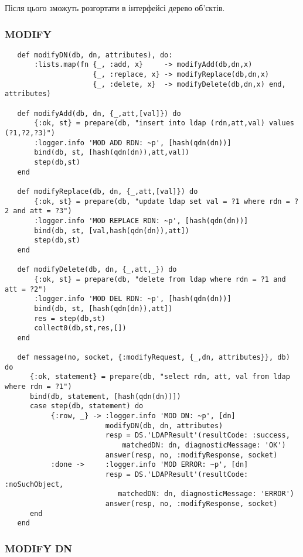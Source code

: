 Після цього зможуть розгортати в інтерфейсі дерево об'єктів.

\newpage
\subsubsection{MODIFY}

\begin{lstlisting}
   def modifyDN(db, dn, attributes), do:
       :lists.map(fn {_, :add, x}     -> modifyAdd(db,dn,x)
                     {_, :replace, x} -> modifyReplace(db,dn,x)
                     {_, :delete, x}  -> modifyDelete(db,dn,x) end, attributes)

   def modifyAdd(db, dn, {_,att,[val]}) do
       {:ok, st} = prepare(db, "insert into ldap (rdn,att,val) values (?1,?2,?3)")
       :logger.info 'MOD ADD RDN: ~p', [hash(qdn(dn))]
       bind(db, st, [hash(qdn(dn)),att,val])
       step(db,st)
   end

   def modifyReplace(db, dn, {_,att,[val]}) do
       {:ok, st} = prepare(db, "update ldap set val = ?1 where rdn = ?2 and att = ?3")
       :logger.info 'MOD REPLACE RDN: ~p', [hash(qdn(dn))]
       bind(db, st, [val,hash(qdn(dn)),att])
       step(db,st)
   end

   def modifyDelete(db, dn, {_,att,_}) do
       {:ok, st} = prepare(db, "delete from ldap where rdn = ?1 and att = ?2")
       :logger.info 'MOD DEL RDN: ~p', [hash(qdn(dn))]
       bind(db, st, [hash(qdn(dn)),att])
       res = step(db,st)
       collect0(db,st,res,[])
   end

   def message(no, socket, {:modifyRequest, {_,dn, attributes}}, db) do
      {:ok, statement} = prepare(db, "select rdn, att, val from ldap where rdn = ?1")
      bind(db, statement, [hash(qdn(dn))])
      case step(db, statement) do
           {:row, _} -> :logger.info 'MOD DN: ~p', [dn]
                        modifyDN(db, dn, attributes)
                        resp = DS.'LDAPResult'(resultCode: :success,
                            matchedDN: dn, diagnosticMessage: 'OK')
                        answer(resp, no, :modifyResponse, socket)
           :done ->     :logger.info 'MOD ERROR: ~p', [dn]
                        resp = DS.'LDAPResult'(resultCode: :noSuchObject,
                           matchedDN: dn, diagnosticMessage: 'ERROR')
                        answer(resp, no, :modifyResponse, socket)
      end
   end
\end{lstlisting}

\newpage
\subsubsection{MODIFY DN}

